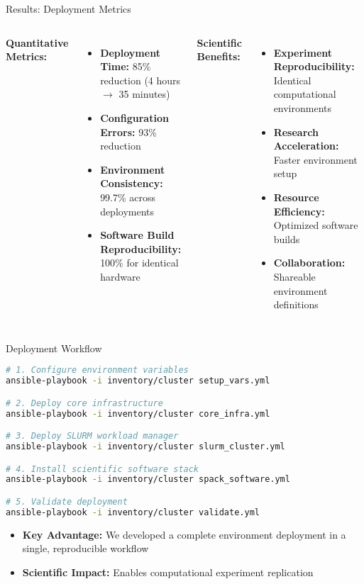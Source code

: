 \documentclass[aspectratio=169]{beamer}
\begin{document}
\begin{frame}{Results: Deployment Metrics}
  \begin{columns}
    \textbf{Quantitative Metrics:}
    \begin{itemize}
      \item \textbf{Deployment Time:} 85\% reduction (4 hours $\rightarrow$ 35 minutes)
      \item \textbf{Configuration Errors:} 93\% reduction
      \item \textbf{Environment Consistency:} 99.7\% across deployments
      \item \textbf{Software Build Reproducibility:} 100\% for identical hardware
    \end{itemize}
    
    \textbf{Scientific Benefits:}
    \begin{itemize}
      \item \textbf{Experiment Reproducibility:} Identical computational environments
      \item \textbf{Research Acceleration:} Faster environment setup
      \item \textbf{Resource Efficiency:} Optimized software builds
      \item \textbf{Collaboration:} Shareable environment definitions
    \end{itemize}
  \end{columns}
\end{frame}

\begin{frame}[fragile]{Deployment Workflow}
  \begin{lstlisting}[language=bash]
# 1. Configure environment variables
ansible-playbook -i inventory/cluster setup_vars.yml

# 2. Deploy core infrastructure
ansible-playbook -i inventory/cluster core_infra.yml

# 3. Deploy SLURM workload manager
ansible-playbook -i inventory/cluster slurm_cluster.yml

# 4. Install scientific software stack
ansible-playbook -i inventory/cluster spack_software.yml

# 5. Validate deployment
ansible-playbook -i inventory/cluster validate.yml
  \end{lstlisting}
  
  \vspace{0.2cm}
  \begin{itemize}
    \item \textbf{Key Advantage:} We developed a complete environment deployment in a single, reproducible workflow
    \item \textbf{Scientific Impact:} Enables computational experiment replication
  \end{itemize}
\end{frame}
\end{document}
